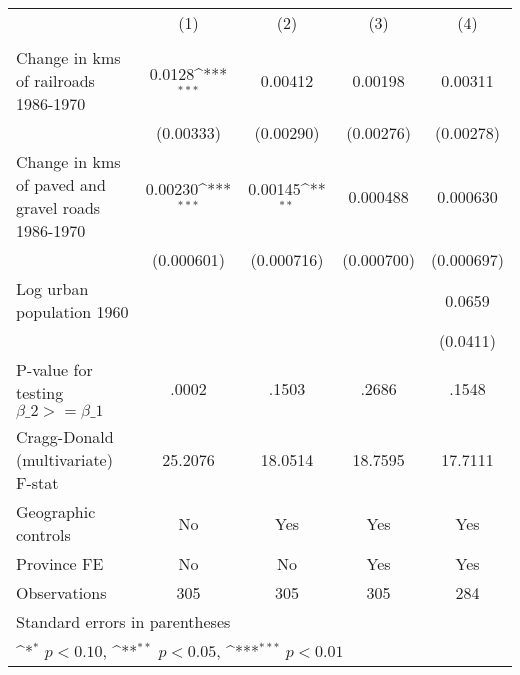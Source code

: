 {
\def\sym#1{\ifmmode^{#1}\else\(^{#1}\)\fi}
\begin{tabular}{l*{4}{c}}
\hline\hline
                &\multicolumn{1}{c}{(1)}&\multicolumn{1}{c}{(2)}&\multicolumn{1}{c}{(3)}&\multicolumn{1}{c}{(4)}\\
                &\multicolumn{1}{c}{}&\multicolumn{1}{c}{}&\multicolumn{1}{c}{}&\multicolumn{1}{c}{}\\
\hline
Change in kms of railroads 1986-1970&   0.0128\sym{***}&  0.00412         &  0.00198         &  0.00311         \\
                &(0.00333)         &(0.00290)         &(0.00276)         &(0.00278)         \\
[1em]
Change in kms of paved and gravel roads 1986-1970&  0.00230\sym{***}&  0.00145\sym{**} & 0.000488         & 0.000630         \\
                &(0.000601)         &(0.000716)         &(0.000700)         &(0.000697)         \\
[1em]
Log urban population 1960&                  &                  &                  &   0.0659         \\
                &                  &                  &                  & (0.0411)         \\
\hline
P-value for testing $\beta\_{2} >= \beta\_{1}$&    .0002         &    .1503         &    .2686         &    .1548         \\
Cragg-Donald (multivariate) F-stat&  25.2076         &  18.0514         &  18.7595         &  17.7111         \\
Geographic controls&       No         &      Yes         &      Yes         &      Yes         \\
Province FE     &       No         &       No         &      Yes         &      Yes         \\
Observations    &      305         &      305         &      305         &      284         \\
\hline\hline
\multicolumn{5}{l}{\footnotesize Standard errors in parentheses}\\
\multicolumn{5}{l}{\footnotesize \sym{*} \(p<0.10\), \sym{**} \(p<0.05\), \sym{***} \(p<0.01\)}\\
\end{tabular}
}

